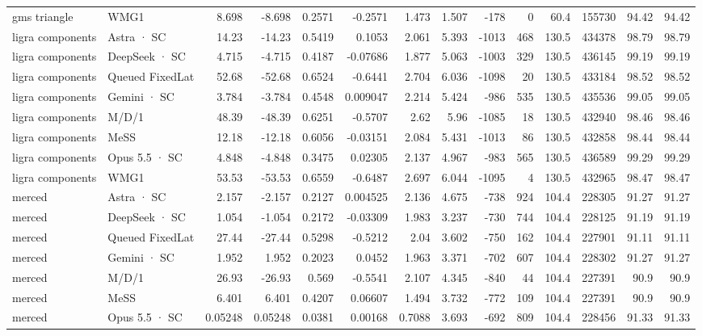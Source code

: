 \begin{tabular}{llrrrrrrrrrrrr}
gms triangle & WMG1 & 8.698 & -8.698 & 0.2571 & -0.2571 & 1.473 & 1.507 & -178 & 0 & 60.4 & 155730 & 94.42 & 94.42 \\
ligra components & Astra · SC & 14.23 & -14.23 & 0.5419 & 0.1053 & 2.061 & 5.393 & -1013 & 468 & 130.5 & 434378 & 98.79 & 98.79 \\
ligra components & DeepSeek · SC & 4.715 & -4.715 & 0.4187 & -0.07686 & 1.877 & 5.063 & -1003 & 329 & 130.5 & 436145 & 99.19 & 99.19 \\
ligra components & Queued FixedLat & 52.68 & -52.68 & 0.6524 & -0.6441 & 2.704 & 6.036 & -1098 & 20 & 130.5 & 433184 & 98.52 & 98.52 \\
ligra components & Gemini · SC & 3.784 & -3.784 & 0.4548 & 0.009047 & 2.214 & 5.424 & -986 & 535 & 130.5 & 435536 & 99.05 & 99.05 \\
ligra components & M/D/1 & 48.39 & -48.39 & 0.6251 & -0.5707 & 2.62 & 5.96 & -1085 & 18 & 130.5 & 432940 & 98.46 & 98.46 \\
ligra components & MeSS & 12.18 & -12.18 & 0.6056 & -0.03151 & 2.084 & 5.431 & -1013 & 86 & 130.5 & 432858 & 98.44 & 98.44 \\
ligra components & Opus 5.5 · SC & 4.848 & -4.848 & 0.3475 & 0.02305 & 2.137 & 4.967 & -983 & 565 & 130.5 & 436589 & 99.29 & 99.29 \\
ligra components & WMG1 & 53.53 & -53.53 & 0.6559 & -0.6487 & 2.697 & 6.044 & -1095 & 4 & 130.5 & 432965 & 98.47 & 98.47 \\
merced & Astra · SC & 2.157 & -2.157 & 0.2127 & 0.004525 & 2.136 & 4.675 & -738 & 924 & 104.4 & 228305 & 91.27 & 91.27 \\
merced & DeepSeek · SC & 1.054 & -1.054 & 0.2172 & -0.03309 & 1.983 & 3.237 & -730 & 744 & 104.4 & 228125 & 91.19 & 91.19 \\
merced & Queued FixedLat & 27.44 & -27.44 & 0.5298 & -0.5212 & 2.04 & 3.602 & -750 & 162 & 104.4 & 227901 & 91.11 & 91.11 \\
merced & Gemini · SC & 1.952 & 1.952 & 0.2023 & 0.0452 & 1.963 & 3.371 & -702 & 607 & 104.4 & 228302 & 91.27 & 91.27 \\
merced & M/D/1 & 26.93 & -26.93 & 0.569 & -0.5541 & 2.107 & 4.345 & -840 & 44 & 104.4 & 227391 & 90.9 & 90.9 \\
merced & MeSS & 6.401 & 6.401 & 0.4207 & 0.06607 & 1.494 & 3.732 & -772 & 109 & 104.4 & 227391 & 90.9 & 90.9 \\
merced & Opus 5.5 · SC & 0.05248 & 0.05248 & 0.0381 & 0.00168 & 0.7088 & 3.693 & -692 & 809 & 104.4 & 228456 & 91.33 & 91.33 \\

\end{tabular}
